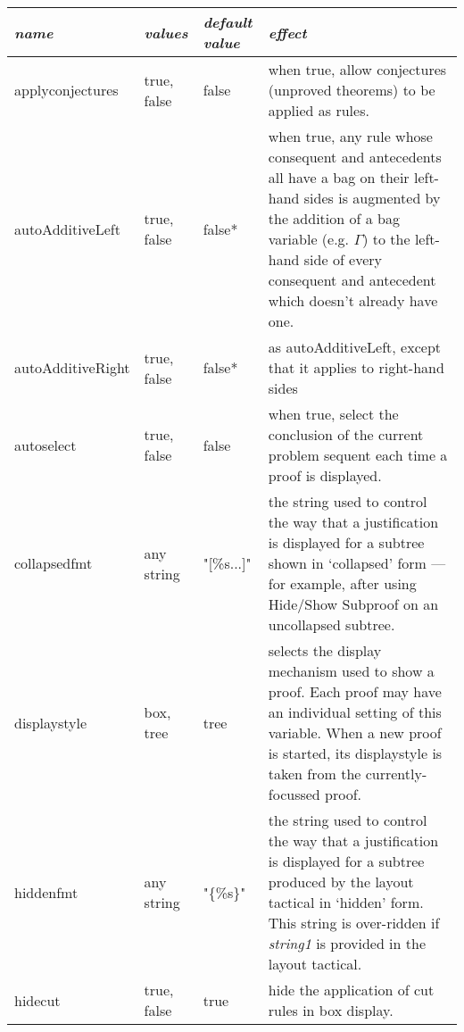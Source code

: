 \begin{tabular}{|p{1.034in}|p{0.635in}|p{0.717in}|p{2.114in}|} \hline
{\raggedright \textit{name}} & {\raggedright \textit{values}} & {\raggedright \textit{default value}} & {\raggedright \textit{effect}}\\
\hline
{\raggedright applyconjectures} & {\raggedright true, false} & {\raggedright false} & {\raggedright when true, allow conjectures (unproved theorems) to be applied as rules.}\\
\hline
{\raggedright autoAdditiveLeft} & {\raggedright true, false} & {\raggedright false*} & {\raggedright when true, any rule whose consequent and antecedents all have a bag on their left-hand sides is augmented by the addition of a bag variable (e.g. \ensuremath{\Gamma}) to the left-hand side of every consequent and antecedent which doesn't already have one.}\\
\hline
{\raggedright autoAdditiveRight} & {\raggedright true, false} & {\raggedright false*} & {\raggedright as autoAdditiveLeft, except that it applies to right-hand sides}\\
\hline
{\raggedright autoselect} & {\raggedright true, false} & {\raggedright false} & {\raggedright when true, select the conclusion of the current problem sequent each time a proof is displayed.}\\
\hline
{\raggedright collapsedfmt} & {\raggedright any string} & {\raggedright "[\%s...]"} & {\raggedright the string used to control the way that a justification is displayed for a subtree shown in `collapsed' form --- for example, after using Hide/Show Subproof on an uncollapsed subtree.}\\
\hline
{\raggedright displaystyle} & {\raggedright box, tree} & {\raggedright tree} & {\raggedright selects the display mechanism used to show a proof. Each proof may have an individual setting of this variable. When a new proof is started, its displaystyle is taken from the currently-focussed proof.}\\
\hline
{\raggedright hiddenfmt} & {\raggedright any string} & {\raggedright "\{\%s\}"} & {\raggedright the string used to control the way that a justification is displayed for a subtree produced by the layout tactical in `hidden' form. This string is over-ridden if \textit{string1} is provided in the layout tactical.}\\
\hline
{\raggedright hidecut} & {\raggedright true, false} & {\raggedright true} & {\raggedright hide the application of cut rules in box display.}\\

\end{tabular}
